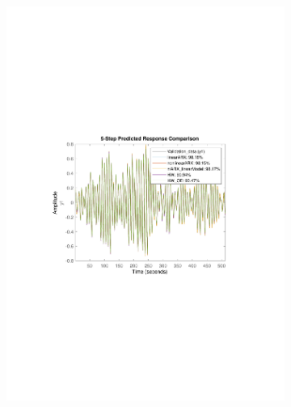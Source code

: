 \documentclass[]{article}
\begin{document}
\begin{figure}[ht]
\centering
\begin{subfigure}{.49\textwidth}
	\centering
	\includegraphics[trim= 10cm 8cm 10cm 8cm, scale=0.4]{figures/predictions_nl.pdf}
\end{subfigure}
\begin{subfigure}{.49\textwidth}
	\centering

\end{subfigure}
\end{figure}
\end{document}
